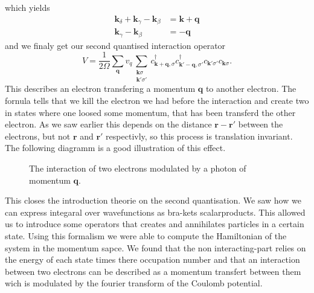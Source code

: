\documentclass[../main.tex]{subfile}
\begin{document}
which yields
\begin{align*}
    \bm{k}_{\delta} + \bm{k}_{\gamma} - \bm{k}_{\beta} &= \bm{k}+ \bm{q}\\
    \bm{k}_{\gamma} - \bm{k}_{\beta} &=  -\bm{q}
\end{align*}
and we finaly get our second quantised interaction operator
\[
    V = \frac{1}{2\Omega} \sum_{\bm{q}}v_{q} \sum_{\substack{\bm{k}\sigma\\\bm{k}'\sigma'}} c^{\dagger}_{\bm{k}+\bm{q},\sigma}c^{\dagger}_{\bm{k}'-\bm{q},\sigma'}c_{\bm{k}'\sigma'}c_{\bm{k}\sigma}.
\]
This describes an electron transfering a momentum $\bm{q}$ to another electron. The fornula tells that we kill the electron we had before the interaction
and create two in states where one loosed some momentum, that has been transferd the other electron. As we saw earlier this depends on the distance $\bm{r}-\bm{r}'$
between the electrons, but not $\bm{r}$ and $\bm{r}'$ respectivly, so this process is translation invariant. The following diagramm is a good illustration of this effect.\\
\begin{figure}[H]
    \centering
    \label{fig:photon_exchange}
    \caption{The interaction of two electrons modulated by a photon of momentum $\bm{q}$.}
\end{figure}
This closes the introduction theorie on the second quantisation. We saw how we can express integaral over wavefunctions as bra-kets scalarproducts. 
This allowed us to introduce some operators that creates and annihilates particles in a certain state. Using this formalism we were able to compute the 
Hamiltonian of the system in the momentum sapce. We found that the non interacting-part relies on the energy of each state times there occupation number
and that an interaction between two electrons can be described as a momentum transfert between them wich is modulated by the fourier transform of the Coulomb potential.
\end{document}

